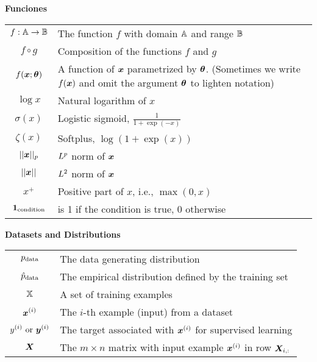 \vspace{\notationgap}
\begin{minipage}{\textwidth}
\centerline{\bf Funciones}
\bgroup
\def\arraystretch{1.5}
\begin{tabular}{cp{3.25in}}
$\displaystyle f: {\mathbb{A}} \rightarrow {\mathbb{B}}$ & The function $f$ with domain ${\mathbb{A}}$ and range ${\mathbb{B}}$\\
$\displaystyle f \circ g $ & Composition of the functions $f$ and $g$ \\
  $\displaystyle f({\bm{x}} ; {\bm{\theta}}) $ & A function of ${\bm{x}}$ parametrized by ${\bm{\theta}}$.
  (Sometimes we write $f({\bm{x}})$ and omit the argument ${\bm{\theta}}$ to lighten notation) \\
$\displaystyle \log x$ & Natural logarithm of $x$ \\
$\displaystyle \sigma(x)$ & Logistic sigmoid, $\displaystyle \frac{1} {1 + \exp(-x)}$ \\
$\displaystyle \zeta(x)$ & Softplus, $\log(1 + \exp(x))$ \\
$\displaystyle || {\bm{x}} ||_p $ & $L^p$ norm of ${\bm{x}}$ \\
$\displaystyle || {\bm{x}} || $ & $L^2$ norm of ${\bm{x}}$ \\
$\displaystyle x^+$ & Positive part of $x$, i.e., $\max(0,x)$\\
$\displaystyle \bm{1}_\mathrm{condition}$ & is 1 if the condition is true, 0 otherwise\\
\end{tabular}
\egroup
{}
\end{minipage}



\vspace{\notationgap}
\begin{minipage}{\textwidth}
\centerline{\bf Datasets and Distributions}
\bgroup
\def\arraystretch{1.5}
\begin{tabular}{cp{3.25in}}
$\displaystyle p_{\rm{data}}$ & The data generating distribution\\
$\displaystyle \hat{p}_{\rm{data}}$ & The empirical distribution defined by the training set\\
$\displaystyle {\mathbb{X}}$ & A set of training examples\\
$\displaystyle {\bm{x}}^{(i)}$ & The $i$-th example (input) from a dataset\\
$\displaystyle y^{(i)}\text{ or }{\bm{y}}^{(i)}$ & The target associated with ${\bm{x}}^{(i)}$ for supervised learning\\
$\displaystyle {\bm{X}}$ & The $m \times n$ matrix with input example ${\bm{x}}^{(i)}$ in row ${\bm{X}}_{i,:}$\\
\end{tabular}
\egroup
\end{minipage}

\clearpage
